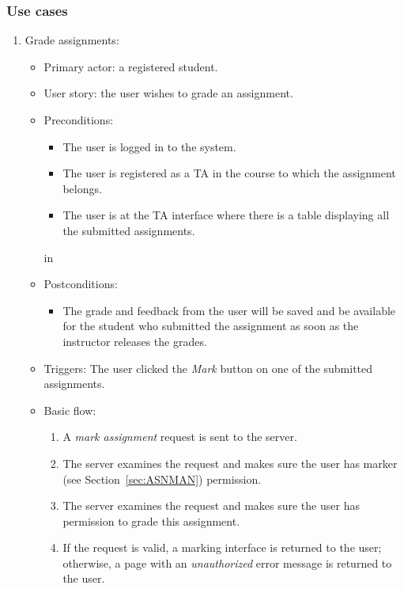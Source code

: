 \subsubsection{Use cases}
\begin{enumerate}
\item Grade assignments:
\begin{itemize}
    \item Primary actor: a registered student.
    \item User story: the user wishes to grade an assignment.
    \item Preconditions:
        \begin{itemize}
            \item The user is logged in to the system.
            \item The user is registered as a TA in the course
                to which the assignment belongs.
            \item The user is at the TA interface where there
                is a table displaying all the submitted assignments.
        \end{itemize}
     in
    \item Postconditions:
        \begin{itemize}
            \item The grade and feedback from the user will be saved and be
                available for the student who submitted the assignment as soon
                as the instructor releases the grades.
        \end{itemize}
    \item Triggers:
        The user clicked the \emph{Mark} button on one of the submitted
        assignments.
    \item Basic flow:
        \begin{enumerate}
            \item A \emph{mark assignment} request is sent to the server.
            \item The server examines the request and makes sure the user has
                marker (see Section~\ref{sec:ASNMAN}) permission.
            \item The server examines the request and makes sure the user has
                permission to grade this assignment.
            \item If the request is valid, a marking interface is returned to
                the user; otherwise, a page with an \emph{unauthorized} error
                message is returned to the user.

\end{enumerate}
\end{itemize}
\end{enumerate}
